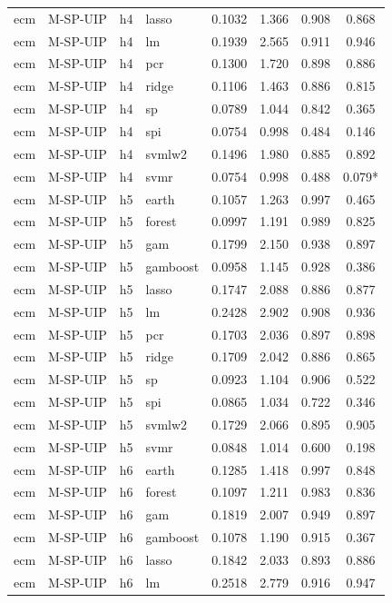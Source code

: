 \begin{ThreePartTable}
\begin{longtable}[t]{llclcccc}
ecm & M-SP-UIP & h4 & lasso & 0.1032 & 1.366 & 0.908 & 0.868\\
ecm & M-SP-UIP & h4 & lm & 0.1939 & 2.565 & 0.911 & 0.946\\
ecm & M-SP-UIP & h4 & pcr & 0.1300 & 1.720 & 0.898 & 0.886\\
ecm & M-SP-UIP & h4 & ridge & 0.1106 & 1.463 & 0.886 & 0.815\\
ecm & M-SP-UIP & h4 & sp & 0.0789 & 1.044 & 0.842 & 0.365\\
ecm & M-SP-UIP & h4 & spi & 0.0754 & 0.998 & 0.484 & 0.146\\
ecm & M-SP-UIP & h4 & svmlw2 & 0.1496 & 1.980 & 0.885 & 0.892\\
ecm & M-SP-UIP & h4 & svmr & 0.0754 & 0.998 & 0.488 & 0.079*\\
\addlinespace
ecm & M-SP-UIP & h5 & earth & 0.1057 & 1.263 & 0.997 & 0.465\\
ecm & M-SP-UIP & h5 & forest & 0.0997 & 1.191 & 0.989 & 0.825\\
ecm & M-SP-UIP & h5 & gam & 0.1799 & 2.150 & 0.938 & 0.897\\
ecm & M-SP-UIP & h5 & gamboost & 0.0958 & 1.145 & 0.928 & 0.386\\
ecm & M-SP-UIP & h5 & lasso & 0.1747 & 2.088 & 0.886 & 0.877\\
ecm & M-SP-UIP & h5 & lm & 0.2428 & 2.902 & 0.908 & 0.936\\
ecm & M-SP-UIP & h5 & pcr & 0.1703 & 2.036 & 0.897 & 0.898\\
ecm & M-SP-UIP & h5 & ridge & 0.1709 & 2.042 & 0.886 & 0.865\\
ecm & M-SP-UIP & h5 & sp & 0.0923 & 1.104 & 0.906 & 0.522\\
ecm & M-SP-UIP & h5 & spi & 0.0865 & 1.034 & 0.722 & 0.346\\
ecm & M-SP-UIP & h5 & svmlw2 & 0.1729 & 2.066 & 0.895 & 0.905\\
ecm & M-SP-UIP & h5 & svmr & 0.0848 & 1.014 & 0.600 & 0.198\\
\addlinespace
ecm & M-SP-UIP & h6 & earth & 0.1285 & 1.418 & 0.997 & 0.848\\
ecm & M-SP-UIP & h6 & forest & 0.1097 & 1.211 & 0.983 & 0.836\\
ecm & M-SP-UIP & h6 & gam & 0.1819 & 2.007 & 0.949 & 0.897\\
ecm & M-SP-UIP & h6 & gamboost & 0.1078 & 1.190 & 0.915 & 0.367\\
ecm & M-SP-UIP & h6 & lasso & 0.1842 & 2.033 & 0.893 & 0.886\\
ecm & M-SP-UIP & h6 & lm & 0.2518 & 2.779 & 0.916 & 0.947\\

\end{longtable}
\end{ThreePartTable}

